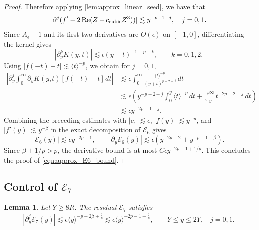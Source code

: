 \documentclass[11pt]{amsart}
\newtheorem{lemma}[theorem]{Lemma}
\theoremstyle{definition}
\theoremstyle{remark}
\numberwithin{equation}{section}
\newcommand{\mc}[1]{\mathcal{#1}}
\newcommand{\ang}[1]{\langle #1 \rangle}
\begin{document}
\begin{proof}
    Therefore applying \cref{lem:approx_linear_seed}, we have that
    \[|\partial^{j}(f' - 2\, \text{Re}(Z + c_{\textup{cubic}}Z^3))| \lesssim y^{-p-1-j}, \quad j = 0,1.\]
    Since $A_\epsilon-1$ and its first two derivatives are $O(\epsilon)$ on $[-1,0]$, differentiating the kernel gives
    \begin{equation}\label{eqn:approx_E6_kernel_bound}
        |\partial_y^kK(y,t)|\lesssim\epsilon(y+t)^{-1-p-k},
        \qquad k=0,1,2.
    \end{equation}
    Using $|f(-t)-t|\lesssim\ang{t}^{-p}$, we obtain for $j=0,1$,
    \begin{equation}\label{eqn:approx_E6_remote_bound}
        \begin{aligned}
            \left|\partial_y^j\int_0^\infty\partial_yK(y,t)[f(-t)-t]\,dt\right|
            &\lesssim\epsilon\int_0^\infty\frac{\ang{t}^{-p}}{(y+t)^{p+2+j}}\,dt\\
            &\lesssim\epsilon\left(y^{-p-2-j}\int_0^y\ang{t}^{-p}\,dt
                +\int_y^\infty t^{-2p-2-j}\,dt\right)\\
            &\lesssim\epsilon y^{-2p-1-j}.
        \end{aligned}
    \end{equation}
    Combining the preceding estimates with $|c_\epsilon|\lesssim\epsilon$, $|f(y)|\lesssim y^{-p}$, and $|f'(y)|\lesssim y^{-\beta}$ in the exact decomposition of $\mc{E}_6$ gives
    \[|\mc{E}_6(y)|\lesssim\epsilon y^{-2p-1},\qquad
      |\partial_y\mc{E}_6(y)|\lesssim\epsilon\left(y^{-2p-2}+y^{-p-1-\beta}\right).\]
    Since $\beta+1/p>p$, the derivative bound is at most $C\epsilon y^{-2p-1+1/p}$. This concludes the proof of \eqref{eqn:approx_E6_bound}.
\end{proof}

\subsection{Control of \texorpdfstring{$\mc{E}_7$}{E7}}

\begin{lemma}\label{lem:approx_E7}
    Let $Y\geq8R$. The residual $\mc{E}_7$ satisfies
    \begin{equation}\label{eqn:approx_E7_bound}
        |\partial_y^j\mc{E}_7(y)|
        \lesssim\epsilon\ang{y}^{-p-2\beta+\frac{j}{p}}
        \lesssim\epsilon\ang{y}^{-2p-1+\frac{j}{p}},
        \qquad Y\leq y\leq2Y,\quad j=0,1.
    \end{equation}
\end{lemma}
\end{document}
